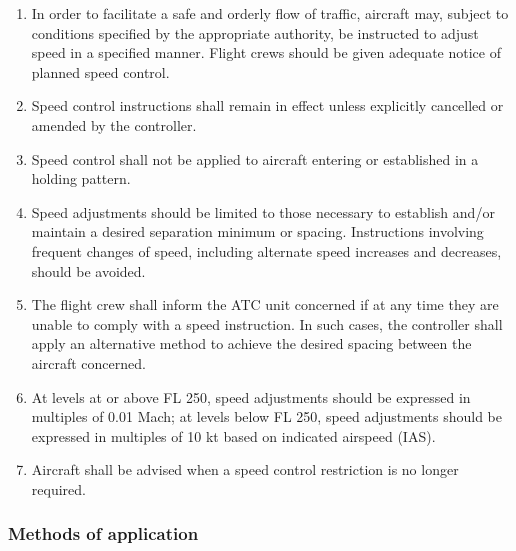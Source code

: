 \begin{enumerate}
    \item In order to facilitate a safe and orderly flow of traffic, aircraft may, subject to conditions specified by the appropriate authority, be instructed to adjust speed in a specified manner. Flight crews should be given adequate notice of planned speed control.
    \item Speed control instructions shall remain in effect unless explicitly cancelled or amended by the controller.
    \item Speed control shall not be applied to aircraft entering or established in a holding pattern.
    \item Speed adjustments should be limited to those necessary to establish and/or maintain a desired separation minimum or spacing. Instructions involving frequent changes of speed, including alternate speed increases and decreases, should be avoided.
    \item The flight crew shall inform the ATC unit concerned if at any time they are unable to comply with a speed instruction. In such cases, the controller shall apply an alternative method to achieve the desired spacing between the aircraft concerned.
    \item At levels at or above FL 250, speed adjustments should be expressed in multiples of 0.01 Mach; at levels below FL 250, speed adjustments should be expressed in multiples of 10 kt based on indicated airspeed (IAS).
    \item Aircraft shall be advised when a speed control restriction is no longer required.
\end{enumerate}

\subsubsection{Methods of application}

